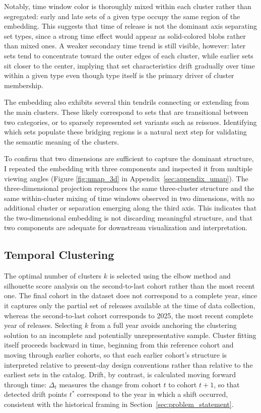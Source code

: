 \documentclass[11pt, letterpaper]{article}
\begin{document}
Notably, time window color is thoroughly mixed within each cluster rather than segregated: early and late sets of a given type occupy the same region of the embedding. This suggests that time of release is not the dominant axis separating set types, since a strong time effect would appear as solid-colored blobs rather than mixed ones. A weaker secondary time trend is still visible, however: later sets tend to concentrate toward the outer edges of each cluster, while earlier sets sit closer to the center, implying that set characteristics drift gradually over time within a given type even though type itself is the primary driver of cluster membership.

The embedding also exhibits several thin tendrils connecting or extending from the main clusters. These likely correspond to sets that are transitional between two categories, or to sparsely represented set variants such as reissues. Identifying which sets populate these bridging regions is a natural next step for validating the semantic meaning of the clusters.

To confirm that two dimensions are sufficient to capture the dominant structure, I repeated the embedding with three components and inspected it from multiple viewing angles (Figure \ref{fig:umap_3d} in Appendix~\ref{sec:appendix_umap}). The three-dimensional projection reproduces the same three-cluster structure and the same within-cluster mixing of time windows observed in two dimensions, with no additional cluster or separation emerging along the third axis. This indicates that the two-dimensional embedding is not discarding meaningful structure, and that two components are adequate for downstream visualization and interpretation.

\subsection{Temporal Clustering}
\label{sec:temporal_clustering}

The optimal number of clusters $k$ is selected using the elbow method and silhouette score analysis on the second-to-last cohort rather than the most recent one. The final cohort in the dataset does not correspond to a complete year, since it captures only the partial set of releases available at the time of data collection, whereas the second-to-last cohort corresponds to 2025, the most recent complete year of releases. Selecting $k$ from a full year avoids anchoring the clustering solution to an incomplete and potentially unrepresentative sample. Cluster fitting itself proceeds backward in time, beginning from this reference cohort and moving through earlier cohorts, so that each earlier cohort's structure is interpreted relative to present-day design conventions rather than relative to the earliest sets in the catalog. Drift, by contrast, is calculated moving forward through time: $\Delta_t$ measures the change from cohort $t$ to cohort $t+1$, so that detected drift points $t^*$ correspond to the year in which a shift occurred, consistent with the historical framing in Section~\ref{sec:problem_statement}.
\end{document}
